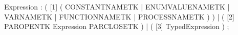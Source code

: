 %
%
%
\begin{rail}
Expression : ( [1] ( CONSTANTNAMETK
                   | ENUMVALUENAMETK
                   | VARNAMETK
                   | FUNCTIONNAMETK
                   | PROCESSNAMETK ) )
           | ( [2] PAROPENTK Expression PARCLOSETK )
           | ( [3] TypedExpression )
           ;
\end{rail}
